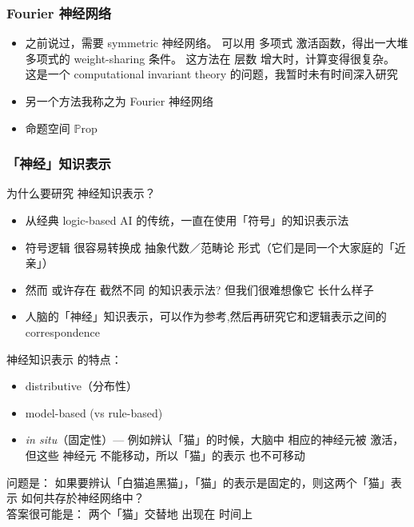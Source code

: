 \documentclass[16pt]{beamer}
\newcommand{\emp}[1]{{\color{violet}#1}}
\begin{document}
\begin{frame}
\frametitle{Fourier 神经网络}
\begin{itemize}
	\item 之前说过，需要 symmetric 神经网络。 可以用 \emp{多项式} 激活函数，得出一大堆 多项式的 weight-sharing 条件。 这方法在 层数 增大时，计算变得很复杂。 这是一个 computational invariant theory 的问题，我暂时未有时间深入研究
	
	\item 另一个方法我称之为 Fourier 神经网络
	\item 命题空间 $\mathbb{P}\mathrm{rop}$
\end{itemize}
\end{frame}

\begin{frame}
\frametitle{「神经」知识表示}
为什么要研究 神经知识表示？
\begin{itemize}
	\item 从经典 logic-based AI 的传统，一直在使用「符号」的知识表示法

	\item 符号逻辑 很容易转换成 抽象代数／范畴论 形式（它们是同一个大家庭的「近亲」）
	
	\item 然而 或许存在 截然不同 的知识表示法? 但我们很难想像它 \emp{长什么样子}

	\item 人脑的「神经」知识表示，可以作为参考,然后再研究它和逻辑表示之间的 correspondence
\end{itemize}

\vspace*{0.4cm} 神经知识表示 的特点：
\begin{itemize}
	\item distributive（分布性）

	\item model-based (vs rule-based)

	\item \textit{in situ}（固定性）--- 例如辨认「猫」的时候，大脑中 相应的神经元被 激活，但这些 神经元 \emp{不能移动}，所以「猫」的表示 也不可移动
\end{itemize}
问题是： 如果要辨认「白猫追黑猫」，「猫」的表示是固定的，则这两个「猫」表示 如何\emp{共存}於神经网络中？\\
答案很可能是： 两个「猫」\emp{交替}地 出现在 \emp{时间}上
\end{frame}
\end{document}
